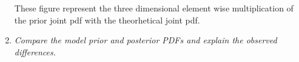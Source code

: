 \documentclass[12pt,runningheads]{article}
\begin{document}
\begin{enumerate}
\begin{figure}[!h]
\end{figure}
These figure represent the three dimensional element wise multiplication of the prior joint pdf with the theorhetical joint pdf.
\pagebreak
\item \textit{Compare the model prior and posterior PDFs and explain the observed differences.}
\end{enumerate}
\end{document}
